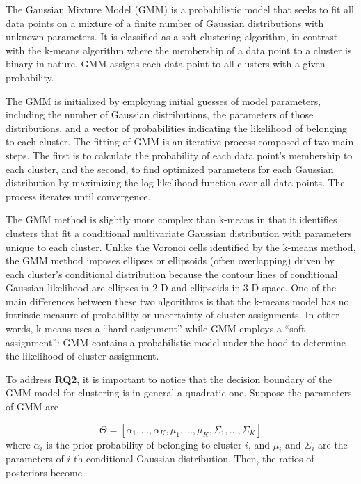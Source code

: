 \documentclass[10pt,journal,compsoc]{IEEEtran}
\begin{document}
    The Gaussian Mixture Model (GMM) is a probabilistic model that seeks to fit all data points on a mixture of a finite number of Gaussian distributions with unknown parameters. It is classified as a soft clustering algorithm, in contrast with the k-means algorithm where the membership of a data point to a cluster is binary in nature. GMM assigns each data point to all clusters with a given probability.
    
    The GMM is initialized by employing initial guesses of model parameters, including the number of Gaussian distributions, the parameters of those distributions, and a vector of probabilities indicating the likelihood of belonging to each cluster. The fitting of GMM is an iterative process composed of two main steps. The first is to calculate the probability of each data point's membership to each cluster, and the second, to find optimized parameters for each Gaussian distribution by maximizing the log-likelihood function over all data points. The process iterates until convergence.
    
    The GMM method is slightly more complex than k-means in that it identifies clusters that fit a conditional multivariate Gaussian distribution with parameters unique to each cluster. Unlike the Voronoi cells identified by the k-means method, the GMM method imposes ellipses or ellipsoids (often overlapping) driven by each cluster’s conditional distribution because the contour lines of conditional Gaussian likelihood are ellipses in 2-D and ellipsoids in 3-D space. One of the main differences between these two algorithms is that the k-means model has no intrinsic measure of probability or uncertainty of cluster assignments. In other words, k-means uses a “hard assignment” while GMM employs a “soft assignment”: GMM contains a probabilistic model under the hood to determine the likelihood of cluster assignment.
    
    To address \textbf{RQ2}, it is important to notice that the decision boundary of the GMM model for clustering is in general a quadratic one. Suppose the parameters of GMM are
    
    \begin{equation}
        \Theta = [\alpha_1,...,\alpha_K,\mu_1,...,\mu_K,\Sigma_1,...,\Sigma_K]
    \end{equation}
    where $\alpha_i$ is the prior probability of belonging to cluster $i$, and $\mu_i$ and $\Sigma_i$ are the parameters of $i$-th conditional Gaussian distribution. Then, the ratios of posteriors become
    
\end{document}
